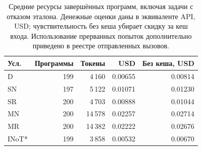 \begin{table}[htbp]\centering\small
\caption{Средние ресурсы завершённых программ, включая задачи с отказом эталона. Денежные оценки даны в эквиваленте API, USD; чувствительность без кеша убирает скидку за кеш входа. Использование прерванных попыток дополнительно приведено в реестре отправленных вызовов.}\label{tab:heldout-resources}
\begin{tabular}{lrrrr}\toprule
Усл. & Программы & Токены & USD & Без кеша, USD\\
\midrule
D & 199 & 4\,160 & 0.00655 & 0.00814\\
SN & 197 & 5\,122 & 0.01071 & 0.01230\\
SR & 200 & 4\,703 & 0.00888 & 0.01044\\
MN & 200 & 14\,578 & 0.02257 & 0.02714\\
MR & 200 & 14\,382 & 0.02222 & 0.02676\\
INoT* & 199 & 3\,858 & 0.00532 & 0.00670\\
\bottomrule\end{tabular}\end{table}
